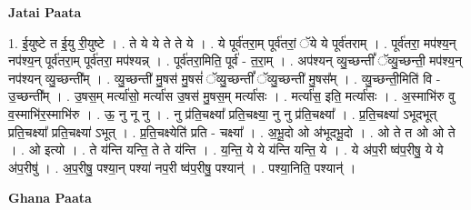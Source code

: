 \documentclass[17pt]{extarticle}
\begin{document}
\textbf{Jatai Paata} \newline

1. ई॒युष्टे त ई॒यु री॒युष्टे । . ते ये ये ते ते ये । . ये पूर्व॑तरा॒म् पूर्व॑तरां॒ ॅये ये पूर्व॑तराम् । . पूर्व॑तरा॒ मप॑श्य॒न् नप॑श्य॒न् पूर्व॑तरा॒म् पूर्व॑तरा॒ मप॑श्यन्न् । . पूर्व॑तरा॒मिति॒ पूर्व॑ - त॒रा॒म् । . अप॑श्यन् व्यु॒च्छन्तीं᳚ ॅव्यु॒च्छन्ती॒ मप॑श्य॒न् नप॑श्यन् व्यु॒च्छन्ती᳚म् । . व्यु॒च्छन्ती॑ मु॒षस॑ मु॒षसं॑ ॅव्यु॒च्छन्तीं᳚ ॅव्यु॒च्छन्ती॑ मु॒षस᳚म् । . व्यु॒च्छन्ती॒मिति॑ वि - उ॒च्छन्ती᳚म् । . उ॒षस॒म् मर्त्या॑सो॒ मर्त्या॑स उ॒षस॑ मु॒षस॒म् मर्त्या॑सः । . मर्त्या॑स॒ इति॒ मर्त्या॑सः । . अ॒स्माभि॑रु वु व॒स्माभि॑र॒स्माभि॑रु । . ऊ॒ नु नू नु । . नु प्र॑ति॒चक्ष्या᳚ प्रति॒चक्ष्या॒ नु नु प्र॑ति॒चक्ष्या᳚ । . प्र॒ति॒चक्ष्या॑ ऽभूदभूत् प्रति॒चक्ष्या᳚ प्रति॒चक्ष्या॑ ऽभूत् । . प्र॒ति॒चक्ष्येति॑ प्रति - चक्ष्या᳚ । . अ॒भू॒दो ओ अ॑भूदभू॒दो । . ओ ते त ओ ओ ते । . ओ इत्यो । . ते य॑न्ति यन्ति॒ ते ते य॑न्ति । . य॒न्ति॒ ये ये य॑न्ति यन्ति॒ ये । . ये अ॑प॒री ष्व॑प॒रीषु॒ ये ये अ॑प॒रीषु॑ । . अ॒प॒रीषु॒ पश्या॒न् पश्या॑ नप॒री ष्व॑प॒रीषु॒ पश्यान्॑ । . पश्या॒निति॒ पश्यान्॑ । \newline

\textbf{Ghana Paata } \newline
\end{document}

